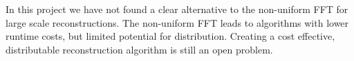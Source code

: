 In this project we have not found a clear alternative to the non-uniform FFT for large scale reconstructions. The non-uniform FFT leads to algorithms with lower runtime costs, but limited potential for distribution. Creating a cost effective, distributable reconstruction algorithm is still an open problem. 







